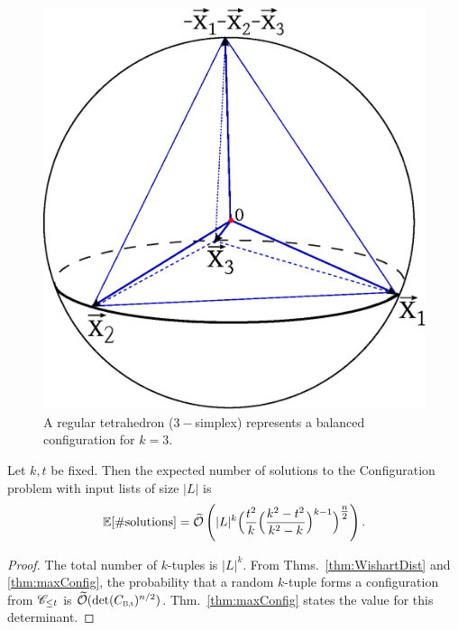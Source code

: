 \begin{figure}[t]
	\centering
	\includegraphics[scale=0.38]{tetrahedron}
	\caption[Balanced Configuration]{A regular tetrahedron ($3-$simplex) represents a balanced configuration for $k=3$.}
	\label{fig:Tetrahedron}
\end{figure}

\begin{corollary} \label{cor:NumberOfSolutions}
	Let $k,t$ be fixed. Then the expected number of solutions to the Configuration problem with input lists of size $|L|$ is
	\begin{equation} \label{eq:ExpNumberOfSolutions}
	\operatorname*{\mathbb{E}}[\# \text{solutions}] = \widetilde{\mathcal{O}} \left( |L|^k \Bigl(\frac{t^2}{k} \Bigl( \frac{k^2-t^2}{k^2-k} \Bigr)^{k-1}  \Bigr)^{\tfrac{n}{2}} \right).
	\end{equation}
\end{corollary}
\begin{proof}
	The total number of $k$-tuples is $|L|^k$. From Thms.~\ref{thm:WishartDist} and \ref{thm:maxConfig}, the probability that a random $k$-tuple forms a configuration from $\mathscr{C}_{\leq t}$ is $\softO( \det(\Cbalt)^{n/2})$. Thm.~\ref{thm:maxConfig} states the value for this determinant.
\end{proof}

